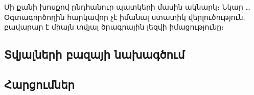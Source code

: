 {
	Մի քանի խոսքով ընդհանուր պատկերի մասին ակնարկ։ Նկար \ldots
	Օգտագործողին հարկավոր չէ իմանալ ստատիկ վերլուծություն, բավարար է միայն տվյալ ծրագրային լեզվի իմացությունը։

	\subsection{Տվյալների բազայի նախագծում}
	

	\subsection{Հարցումներ}\label{subsec:}
	
}
